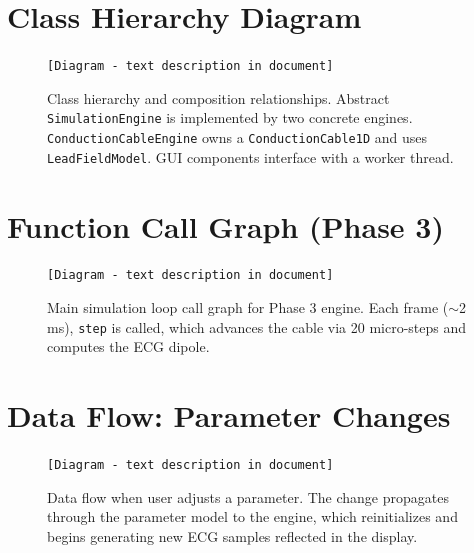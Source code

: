 \documentclass[12pt,a4paper,oneside]{book}
\begin{document}
\section{Class Hierarchy Diagram}

\begin{figure}[H]
    \centering
    
    \begin{center}
    \texttt{[Diagram - text description in document]}
    \end{center}
    
    \caption{Class hierarchy and composition relationships. Abstract \texttt{SimulationEngine} is implemented by two concrete engines. \texttt{ConductionCableEngine} owns a \texttt{ConductionCable1D} and uses \texttt{LeadFieldModel}. GUI components interface with a worker thread.}
    \label{fig:class_hierarchy}
\end{figure}

\section{Function Call Graph (Phase 3)}

\begin{figure}[H]
    \centering
    
    \begin{center}
    \texttt{[Diagram - text description in document]}
    \end{center}
    
    \caption{Main simulation loop call graph for Phase 3 engine. Each frame ($\sim$2 ms), \texttt{step} is called, which advances the cable via 20 micro-steps and computes the ECG dipole.}
    \label{fig:call_graph}
\end{figure}

\section{Data Flow: Parameter Changes}

\begin{figure}[H]
    \centering
    
    \begin{center}
    \texttt{[Diagram - text description in document]}
    \end{center}
    
    \caption{Data flow when user adjusts a parameter. The change propagates through the parameter model to the engine, which reinitializes and begins generating new ECG samples reflected in the display.}
    \label{fig:param_flow}
\end{figure}
\end{document}
